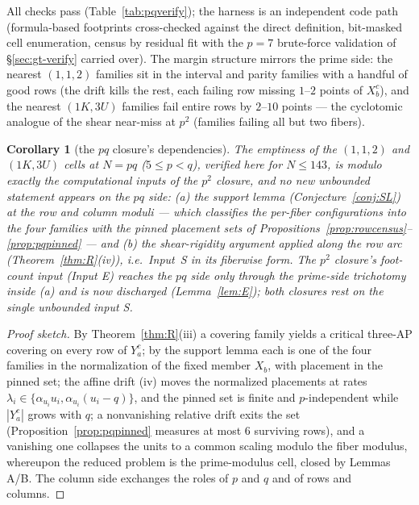 \documentclass[11pt,a4paper]{article}
\numberwithin{equation}{section}
\theoremstyle{plain}
\newtheorem{corollary}[theorem]{Corollary}
\theoremstyle{definition}
\theoremstyle{remark}
\begin{document}
All checks pass (Table~\ref{tab:pqverify}); the harness is an independent
code path (formula-based footprints cross-checked against the direct
definition, bit-masked cell enumeration, census by residual fit with the
$p=7$ brute-force validation of \S\ref{sec:gt-verify} carried over). The
margin structure mirrors the prime side: the nearest $(1,1,2)$ families sit
in the interval and parity families with a handful of good rows (the drift
kills the rest, each failing row missing $1$--$2$ points of $X_b^c$), and the
nearest $(1K,3U)$ families fail entire rows by $2$--$10$ points --- the
cyclotomic analogue of the shear near-miss at $p^2$ (families failing all
but two fibers).

\begin{corollary}[the $pq$ closure's dependencies]\label{cor:pqdep}
The emptiness of the $(1,1,2)$ and $(1K,3U)$ cells at $N=pq$ ($5\le p<q$),
verified here for $N\le143$, is modulo exactly the computational inputs of
the $p^2$ closure, and no new unbounded statement appears on the $pq$
side: \emph{(a)} the support lemma (Conjecture~\ref{conj:SL}) at the row
and column moduli --- which classifies the per-fiber configurations into
the four families with the pinned placement sets of
Propositions~\ref{prop:rowcensus}--\ref{prop:pqpinned} --- and \emph{(b)}
the shear-rigidity argument applied along the row arc
(Theorem~\emph{\ref{thm:R}(iv)}), i.e.\ Input~S in its fiberwise form. The
$p^2$ closure's foot-count input (Input E) reaches the $pq$ side only
through the prime-side trichotomy inside \emph{(a)} and is now
discharged (Lemma~\ref{lem:E}); both closures rest
on the single unbounded input S.
\end{corollary}

\begin{proof}[Proof sketch]
By Theorem~\ref{thm:R}(iii) a covering family yields a critical three-AP
covering on every row of $Y_a^{c}$; by the support lemma each is one of the
four families in the normalization of the fixed member $X_b$, with placement
in the pinned set; the affine drift (iv) moves the normalized placements at
rates $\lambda_i\in\{\alpha_{u_i}u_i,\alpha_{u_i}(u_i-q)\}$, and the pinned
set is finite and $p$-independent while $|Y_a^{c}|$ grows with $q$; a
nonvanishing relative drift exits the set (Proposition~\ref{prop:pqpinned}
measures at most $6$ surviving rows), and a vanishing one collapses the units
to a common scaling modulo the fiber modulus, whereupon the reduced problem
is the prime-modulus cell, closed by Lemmas A/B. The column side exchanges
the roles of $p$ and $q$ and of rows and columns.
\end{proof}
\end{document}
